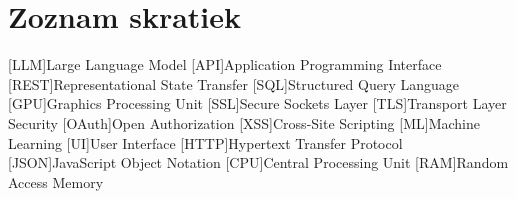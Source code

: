 %
%
%
% 
%
%
% 
%

\chapter*{Zoznam skratiek}

\begin{acronym}[WSXXXX]
    [LLM]{Large Language Model}
    [API]{Application Programming Interface}
    [REST]{Representational State Transfer}
    [SQL]{Structured Query Language}
    [GPU]{Graphics Processing Unit}
    [SSL]{Secure Sockets Layer}
    [TLS]{Transport Layer Security}
    [OAuth]{Open Authorization}
    [XSS]{Cross-Site Scripting}
    [ML]{Machine Learning}
    [UI]{User Interface}
    [HTTP]{Hypertext Transfer Protocol}
    [JSON]{JavaScript Object Notation}
    [CPU]{Central Processing Unit}
    [RAM]{Random Access Memory}
\end{acronym}
